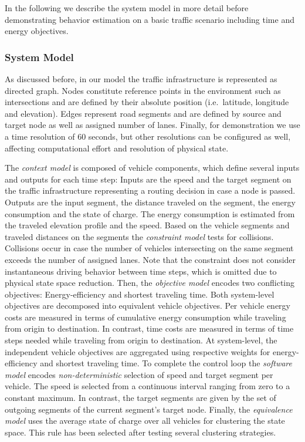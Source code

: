 \documentclass[conference]{../cls/IEEEtran}
\begin{document}
In the following we describe the system model in more detail before demonstrating behavior estimation on a basic traffic scenario including time and energy objectives.

\subsubsection*{System Model}

As discussed before, in our model the traffic infrastructure is represented as
directed graph. Nodes constitute reference points in the environment such as
intersections and are defined by their absolute position (i.e.\ latitude,
longitude and elevation). Edges represent road segments and are defined by
source and target node as well as assigned number of lanes. Finally, for
demonstration we use a time resolution of 60 seconds, but other resolutions can
be configured as well, affecting computational effort and resolution of
physical state.

The \textit{context model} is composed of vehicle components, which define several inputs and outputs for each time step: Inputs are the speed and the target segment on the traffic infrastructure representing a routing decision in case a node is passed. Outputs are the input segment, the distance traveled on the segment, the energy consumption and the state of charge. The energy consumption is estimated from the traveled elevation profile and the speed. Based on the vehicle segments and traveled distances on the segments the \textit{constraint model} tests for collisions. Collisions occur in case the number of vehicles intersecting on the same segment exceeds the number of assigned lanes. Note that the constraint does not consider instantaneous driving behavior between time steps, which is omitted due to physical state space reduction. Then, the \textit{objective model} encodes two conflicting objectives: Energy-efficiency and shortest traveling time. Both system-level objectives are decomposed into equivalent vehicle objectives. Per vehicle energy costs are measured in terms of cumulative energy consumption while traveling from origin to destination. In contrast, time costs are measured in terms of time steps needed while traveling from origin to destination. At system-level, the independent vehicle objectives are aggregated using respective weights for energy-efficiency and shortest traveling time. To complete the control loop the \textit{software model} encodes \textit{non-deterministic} selection of speed and target segment per vehicle. The speed is selected from a continuous interval ranging from zero to a constant maximum. In contrast, the target segments are given by the set of outgoing segments of the current segment's target node. Finally, the \textit{equivalence model} uses the average state of charge over all vehicles for clustering the state space. This rule has been selected after testing several clustering strategies.
\end{document}

